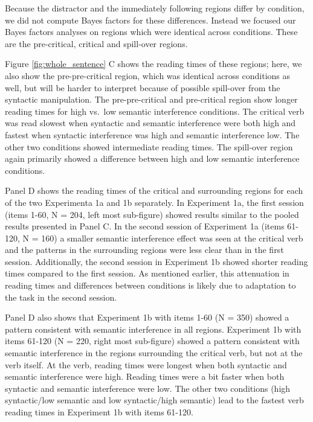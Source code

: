 \documentclass[a4paper, man, floatsintext]{apa7}
\begin{document}
Because the distractor and the immediately following regions differ by condition, we did not compute Bayes factors for these differences. Instead we focused our Bayes factors analyses on regions which were identical across conditions. These are the pre-critical, critical and spill-over regions.


Figure \ref{fig:whole_sentence} C shows the reading times of these regions; here, we also show the pre-pre-critical region, which was identical across conditions as well, but will be harder to interpret because of possible spill-over from the syntactic manipulation. The pre-pre-critical and pre-critical region show longer reading times for high vs.\ low semantic interference conditions. The critical verb was read slowest when syntactic and semantic interference were both high and fastest when syntactic interference was high and semantic interference low. The other two conditions showed intermediate reading times. The spill-over region again primarily showed a difference between high and low semantic interference conditions. 

Panel D shows the reading times of the critical and surrounding regions for each of the two Experimenta 1a and 1b separately. In Experiment 1a, the first session (items 1-60, N = 204, left most sub-figure) showed results similar to the pooled results presented in Panel C. In the second session of Experiment 1a (items 61-120, N = 160) a smaller semantic interference effect was seen at the critical verb and the patterns in the surrounding regions were less clear than in the first session. Additionally, the second session in Experiment 1b showed shorter reading times compared to the first session. As mentioned earlier, this attenuation in reading times and differences between conditions is likely due to  adaptation to the task in the second session. 

Panel D also shows that Experiment 1b with items 1-60 (N = 350) showed a pattern consistent with   semantic interference in all regions. Experiment 1b with items 61-120 (N = 220, right most sub-figure) showed a pattern consistent with semantic interference in the regions surrounding the critical verb, but not at the verb itself. At the verb, reading times were longest when both syntactic and semantic interference were high. Reading times were a bit faster when both syntactic and semantic interference were low. The other two conditions (high syntactic/low semantic and low syntactic/high semantic) lead to the fastest verb reading times in Experiment 1b with items 61-120. 
\end{document}
